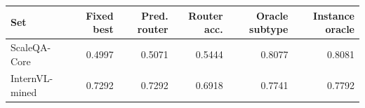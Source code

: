 \begin{tabular}{lrrrrr}
\toprule
Set & Fixed best & Pred. router & Router acc. & Oracle subtype & Instance oracle \\
\midrule
ScaleQA-Core & 0.4997 & 0.5071 & 0.5444 & 0.8077 & 0.8081 \\
InternVL-mined & 0.7292 & 0.7292 & 0.6918 & 0.7741 & 0.7792 \\
\bottomrule
\end{tabular}
